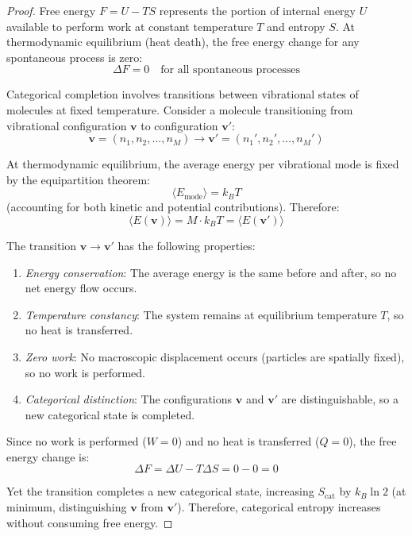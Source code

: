 \documentclass[12pt,a4paper]{article}
\theoremstyle{definition}
\theoremstyle{remark}
\begin{document}
\begin{proof}
Free energy $F = U - TS$ represents the portion of internal energy $U$ available to perform work at constant temperature $T$ and entropy $S$. At thermodynamic equilibrium (heat death), the free energy change for any spontaneous process is zero:
\begin{equation}
\Delta F = 0 \quad \text{for all spontaneous processes}
\end{equation}

Categorical completion involves transitions between vibrational states of molecules at fixed temperature. Consider a molecule transitioning from vibrational configuration $\mathbf{v}$ to configuration $\mathbf{v}'$:
\begin{equation}
\mathbf{v} = (n_1, n_2, \ldots, n_M) \to \mathbf{v}' = (n_1', n_2', \ldots, n_M')
\end{equation}

At thermodynamic equilibrium, the average energy per vibrational mode is fixed by the equipartition theorem:
\begin{equation}
\langle E_{\text{mode}} \rangle = k_B T
\end{equation}
(accounting for both kinetic and potential contributions). Therefore:
\begin{equation}
\langle E(\mathbf{v}) \rangle = M \cdot k_B T = \langle E(\mathbf{v}') \rangle
\end{equation}

The transition $\mathbf{v} \to \mathbf{v}'$ has the following properties:
\begin{enumerate}
    \item \emph{Energy conservation}: The average energy is the same before and after, so no net energy flow occurs.
    \item \emph{Temperature constancy}: The system remains at equilibrium temperature $T$, so no heat is transferred.
    \item \emph{Zero work}: No macroscopic displacement occurs (particles are spatially fixed), so no work is performed.
    \item \emph{Categorical distinction}: The configurations $\mathbf{v}$ and $\mathbf{v}'$ are distinguishable, so a new categorical state is completed.
\end{enumerate}

Since no work is performed ($W = 0$) and no heat is transferred ($Q = 0$), the free energy change is:
\begin{equation}
\Delta F = \Delta U - T \Delta S = 0 - 0 = 0
\end{equation}

Yet the transition completes a new categorical state, increasing $S_{\text{cat}}$ by $k_B \ln 2$ (at minimum, distinguishing $\mathbf{v}$ from $\mathbf{v}'$). Therefore, categorical entropy increases without consuming free energy.
\end{proof}
\end{document}
